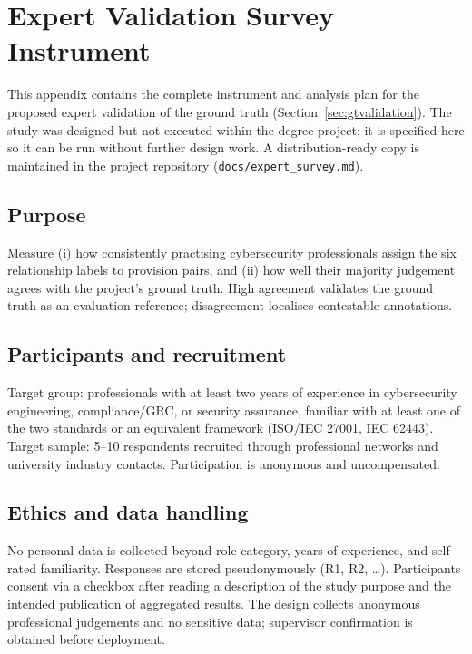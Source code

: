\chapter{Expert Validation Survey Instrument}\label{app:survey}

This appendix contains the complete instrument and analysis plan for the
proposed expert validation of the ground truth
(Section~\ref{sec:gtvalidation}). The study was designed but not executed
within the degree project; it is specified here so it can be run without
further design work. A distribution-ready copy is maintained in the project
repository (\texttt{docs/expert\_survey.md}).

\section{Purpose}

Measure (i) how consistently practising cybersecurity professionals assign
the six relationship labels to provision pairs, and (ii) how well their
majority judgement agrees with the project's ground truth. High agreement
validates the ground truth as an evaluation reference; disagreement localises
contestable annotations.

\section{Participants and recruitment}

Target group: professionals with at least two years of experience in
cybersecurity engineering, compliance/GRC, or security assurance, familiar
with at least one of the two standards or an equivalent framework (ISO/IEC
27001, IEC 62443). Target sample: 5--10 respondents recruited through
professional networks and university industry contacts. Participation is
anonymous and uncompensated.

\section{Ethics and data handling}

No personal data is collected beyond role category, years of experience, and
self-rated familiarity. Responses are stored pseudonymously (R1, R2, \ldots).
Participants consent via a checkbox after reading a description of the study
purpose and the intended publication of aggregated results. The design
collects anonymous professional judgements and no sensitive data;
supervisor confirmation is obtained before deployment.

